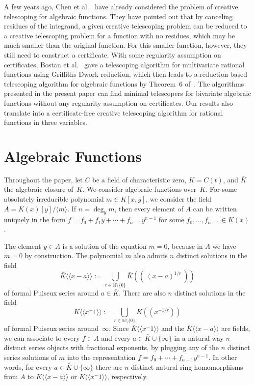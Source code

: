 \documentclass{sig-alternate-05-2015}
\def\<#1>{\langle\!\langle#1\rangle\!\rangle} %
\let\set\mathbb
\begin{document}
A few years ago, Chen et al.~\cite{chen12d} have already considered the problem of creative
telescoping for algebraic functions. They have pointed out that by canceling residues
of the integrand, a given creative telescoping problem can be reduced to a creative
telescoping problem for a function with no residues, which may be much smaller than the
original function. For this smaller function, however, they still need to construct a
certificate. With some regularity assumption on certificates, Bostan et al.~\cite{bostan13}
gave a telescoping algorithm for multivariate rational functions using Griffiths-Dwork reduction,
which then leads to a reduction-based telescoping algorithm for algebraic functions by Theorem~6 of~\cite{chen12d}.
The algorithms presented in the present paper can find minimal
telescopers for bivariate algebraic functions without any regularity assumption on certificates.
Our results also translate into a certificate-free
creative telescoping algorithm for rational functions in three variables.

\section{Algebraic Functions}

Throughout the paper, let $C$ be a field of characteristic zero, $K=C(t)$, and $\bar K$ the algebraic closure of~$K$.
We consider algebraic functions over~$K$.  For some absolutely irreducible
polynomial $m\in K[x,y]$, we consider the field
$A=K(x)[y]/\langle m\rangle$. If $n=\deg_ym$, then every element of $A$ can be written uniquely in the form
$f=f_0+f_1y+\cdots+f_{n-1}y^{n-1}$ for some $f_0,\dots,f_{n-1}\in K(x)$.

The element $y\in A$ is a solution of the equation $m=0$,
because in $A$ we have $m=0$ by construction. The polynomial $m$ also admits
$n$ distinct solutions in the field
\[
  \bar K\<x-a>:=\bigcup_{r\in\set N\setminus\{0\}} \bar K(\!(\ (x-a)^{1/r}\ )\!)
\]
of formal Puiseux series around $a\in\bar K$. There are also $n$ distinct
solutions in the field
\[
  \bar K\<x^{-1}>:=\bigcup_{r\in\set N\setminus\{0\}} \bar K(\!(x^{-1/r})\!)
\]
of formal Puiseux series around~$\infty$.
Since $\bar K\<x^{-1}>$ and the $\bar K\<x-a>$ are fields, we can associate to every
$f\in A$ and every $a\in\bar K\cup\{\infty\}$ in a natural way $n$ distinct series
objects with fractional exponents, by plugging any of the $n$ distinct series solutions
of $m$ into the representation $f=f_0+\cdots+f_{n-1}y^{n-1}$.
In other words, for every $a\in\bar K\cup\{\infty\}$ there are $n$ distinct natural
ring homomorphisms from $A$ to $K\<x-a>$ or $K\<x^{-1}>$, respectively.
\end{document}
